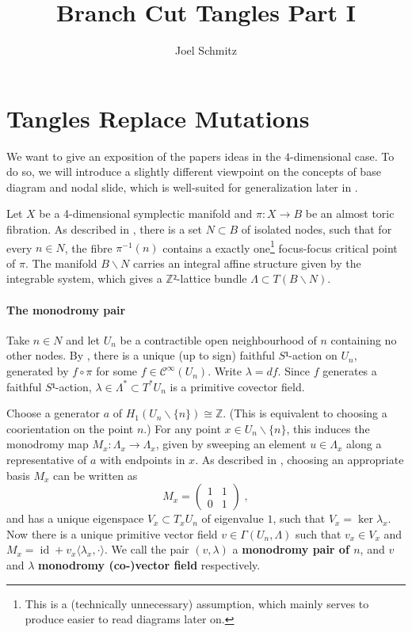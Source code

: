 \documentclass[12pt,a4paper,abstract=true,draft]{scrartcl}
\DeclareMathOperator{\id}{id}
\newcommand\mqty[1]{\begin{pmatrix}#1\end{pmatrix}}
\begin{document}
\title{Branch Cut Tangles Part I}
\author{Joel Schmitz}
\maketitle

\section{Tangles Replace Mutations}

We want to give an exposition of the papers ideas in the $4$-dimensional case.
To do so, we will introduce a slightly different viewpoint on the concepts of base diagram and nodal slide, which is well-suited for generalization later in .

Let $X$ be a 4-dimensional symplectic manifold and $π \colon X → B$ be an almost toric fibration.
As described in \cite{evans2021atfs}, there is a set $N ⊂ B$ of isolated nodes, such that for every $n ∈ N$, the fibre $π^{-1}(n)$ contains a exactly one\footnote{This is a (technically unnecessary) assumption, which mainly serves to produce easier to read diagrams later on.} focus-focus critical point of $π$.
The manifold $B ∖ N$ carries an integral affine structure given by the integrable system, which gives a $ℤ²$-lattice bundle $Λ ⊂ T(B ∖ N)$.

\paragraph{The monodromy pair}
Take $n ∈ N$ and let $U_n$ be a contractible open neighbourhood of $n$ containing no other nodes.
By \cite[Proposition 1]{Zun97}, there is a unique (up to sign) faithful $S¹$-action on $U_n$, generated by $f ∘ π$ for some $f ∈ 𝒞^∞(U_n)$.
Write $λ = df$.
Since $f$ generates a faithful $S¹$-action, $λ ∈ Λ^* ⊂ T^* U_n$ is a primitive covector field.

Choose a generator $a$ of $H_1(U_n ∖ \{n\}) ≅ ℤ$. (This is equivalent to choosing a coorientation on the point $n$.)
For any point $x ∈ U_n ∖ \{n\}$, this induces the monodromy map $M_x \colon Λ_x → Λ_x$, given by sweeping an element $u ∈ Λ_x$ along a representative of $a$ with endpoints in $x$.
As described in \cite[Lemma 1]{Zun97}, choosing an appropriate basis $M_x$ can be written as
\[ M_x = \mqty{1 & 1\\0 & 1}\; ,\]
and has a unique eigenspace $V_x ⊂ T_x U_n$ of eigenvalue $1$, such that $V_x = \ker λ_x$.
Now there is a unique primitive vector field $v ∈ Γ(U_n,Λ)$ such that $v_x ∈ V_x$ and $M_x = \id + v_x ⟨ λ_x, · ⟩$.
We call the pair $(v,λ)$ a \textbf{monodromy pair of $n$}, and $v$ and $λ$ \textbf{monodromy (co-)vector field} respectively.
\end{document}
